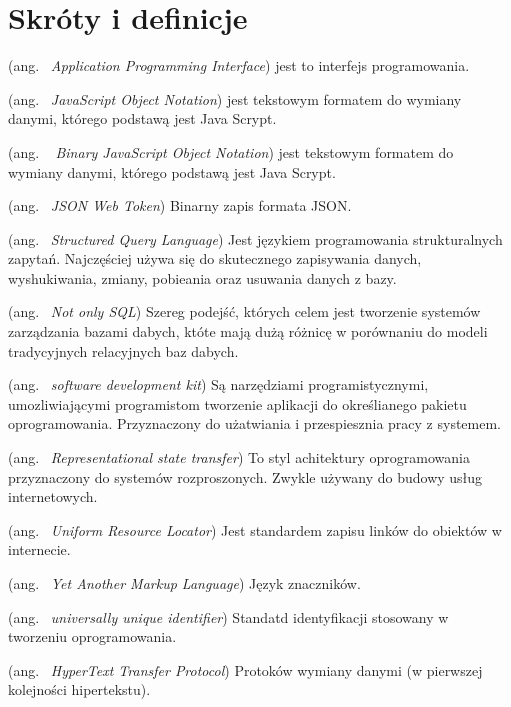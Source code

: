 \chapter*{Skróty i definicje}\mbox{}
\label{sec:skroty}
\noindent
\begin{description}[labelwidth=*]
  \item [API] (ang. \ \emph{Application Programming Interface}) jest to interfejs programowania.
  \item [JSON] (ang. \ \emph{JavaScript Object Notation}) jest tekstowym formatem do wymiany danymi, którego podstawą jest Java Scrypt.
  \item [BSON] (ang. \ \emph{ Binary JavaScript Object Notation}) jest tekstowym formatem do wymiany danymi, którego podstawą jest Java Scrypt.
  \item [JWT] (ang. \ \emph{JSON Web Token}) Binarny zapis formata JSON.
  \item [SQL] (ang. \ \emph{Structured Query Language}) Jest językiem programowania strukturalnych zapytań. Najczęściej używa się do skutecznego zapisywania danych, wyshukiwania, zmiany, pobieania oraz usuwania danych z bazy. 
  \item [NoSQL] (ang. \ \emph{Not only SQL}) Szereg podejść, których celem jest tworzenie systemów zarządzania bazami dabych, któte mają dużą różnicę w porównaniu do modeli tradycyjnych relacyjnych baz dabych.
  \item [SDK] (ang. \ \emph{software development kit}) Są narzędziami programistycznymi, umozliwiającymi programistom tworzenie aplikacji do określianego pakietu oprogramowania. Przyznaczony do użatwiania i przespiesznia pracy z systemem.
  \item [Rest] (ang. \ \emph{Representational state transfer}) To styl achitektury oprogramowania przyznaczony do systemów rozproszonych. Zwykle używany do budowy usług internetowych.
  \item [URL] (ang. \ \emph{Uniform Resource Locator}) Jest standardem zapisu linków do obiektów w internecie.
  \item [YAML] (ang. \ \emph{Yet Another Markup Language}) Język znaczników.
  \item [UUID] (ang. \ \emph{universally unique identifier}) Standatd identyfikacji stosowany w tworzeniu oprogramowania.
  \item [HTTP] (ang. \ \emph{HyperText Transfer Protocol}) Protoków wymiany danymi (w pierwszej kolejności hipertekstu).
\end{description}